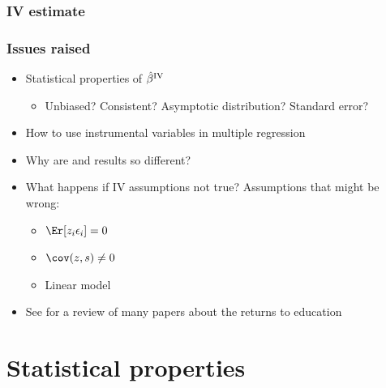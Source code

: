 \begin{frame}[allowframebreaks]
  \frametitle{\cite{angrist1991} IV estimate}
  {\small{
       
    }}
\end{frame}

\begin{frame} 
  \frametitle{Issues raised}
  \begin{itemize}
  \item Statistical properties of ${\hat{\beta}^{\mathrm{IV}}}$
    \begin{itemize}
    \item Unbiased? Consistent? Asymptotic distribution? Standard
      error?
    \end{itemize}
  \item How to use instrumental variables in multiple regression 
  \item Why are \cite{angrist1991} and \cite{card1993} results so
    different?
  \item What happens if IV assumptions not true? Assumptions that
    might be wrong: 
    \begin{itemize}
    \item $\Er[z_i \epsilon_i] = 0$
    \item $\cov(z,s) \neq 0$
    \item Linear model
    \end{itemize}
  \item See \cite{card2003} for a review of many papers about the
    returns to education
  \end{itemize}
\end{frame}

\section{Statistical properties}

